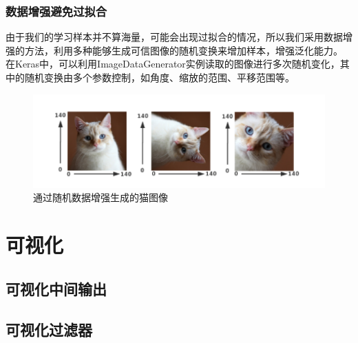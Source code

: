 \documentclass[lang=cn,11pt]{elegantpaper}
\begin{document}
\subsubsection{数据增强避免过拟合}
由于我们的学习样本并不算海量，可能会出现过拟合的情况，所以我们采用数据增强的方法，利用多种能够生成可信图像的随机变换来增加样本，增强泛化能力。 在Keras中，可以利用ImageDataGenerator实例读取的图像进行多次随机变化，其中的随机变换由多个参数控制，如角度、缩放的范围、平移范围等。

\begin{figure}[hbtp]
\centering
  \includegraphics{aug.png}
  \caption{通过随机数据增强生成的猫图像\label{fig:augcat}}
\end{figure}



\section{可视化}

\subsection{可视化中间输出}

\subsection{可视化过滤器}






\newpage
\nocite{*}



\end{document}
